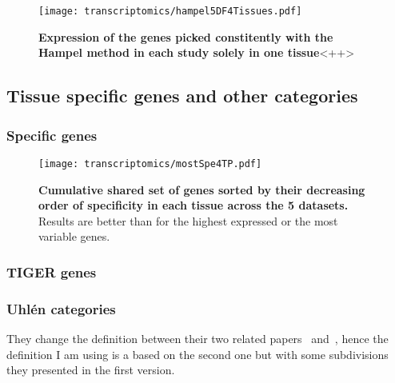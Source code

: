 \begin{figure}[!htpb]
    \texttt{[image: transcriptomics/hampel5DF4Tissues.pdf]}\centering
    \caption[Expression of the genes picked with Hampel method]{\label{fig:hampelExp}%
    \textbf{Expression of the genes picked constitently with the Hampel method
    in each study solely in one tissue}<++>}
\end{figure}

\subsection{Tissue specific genes and other categories}\label{subsec:Trans_TissueSpeAndHK}

\subsubsection{Specific genes}

\begin{figure}[!htpb]
    \texttt{[image: transcriptomics/mostSpe4TP.pdf]}\centering
    \caption[Cumulative shared set of genes sorted by their specificity in each
    tissue across the 5 datasets]{\label{fig:mostSpe4T}\textbf{Cumulative shared
    set of genes sorted by their decreasing order of specificity in each tissue
    across the 5 datasets.} Results are better than for the highest expressed or
    the most variable genes.}
\end{figure}

\subsubsection{TIGER genes}

\subsubsection{Uhlén categories}

They change the definition between their two related papers~
and~, hence the definition I am using is a based on the second
one but with some subdivisions they presented in the first version.

